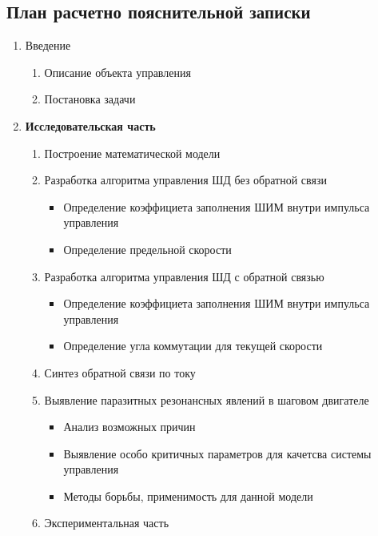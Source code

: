 \newpage
\subsection{План расчетно пояснительной записки}

\begin{enumerate}
    \item Введение
        \begin{enumerate}
            \item Описание объекта управления
            \item Постановка задачи
        \end{enumerate}
    \item \textbf{Исследовательская часть}
        \begin{enumerate}
            \item Построение математической модели
            \item Разработка алгоритма управления ШД без обратной связи
                \begin{itemize}
                    \item Определение коэффициета заполнения ШИМ внутри импульса управления
                    \item Определение предельной скорости
                \end{itemize}
            \item Разработка алгоритма управления ШД с обратной связью
                \begin{itemize}
                    \item Определение коэффициета заполнения ШИМ внутри импульса управления
                    \item Определение угла коммутации для текущей скорости
                \end{itemize}
            \item Синтез обратной связи по току
            \item Выявление паразитных резонансных явлений в шаговом двигателе
                \begin{itemize}
                    \item Анализ возможных причин
                    \item Выявление особо критичных параметров для качетсва системы управления
                    \item Методы борьбы, применимость для данной модели
                \end{itemize}
            \item Экспериментальная часть

\end{enumerate}
\end{enumerate}
